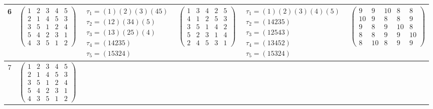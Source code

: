 \begin{longtable}{|c|p{2.7cm}|p{2.7cm}|p{2.7cm}|p{2.7cm}|p{3.3cm}|}
    \hline
    6                                                                                                                                           &
    $\begin{pmatrix}1&2&3&4&5\\2&1&4&5&3\\3&5&1&2&4\\5&4&2&3&1\\4&3&5&1&2\end{pmatrix}$                                                         &
    $\begin{array}{l}\tau_{1}=(1)(2)(3)(45)\\ \tau_{2}=(12)(34)(5)\\ \tau_{3}=(13)(25)(4)\\ \tau_{4}=(14235)\\ \tau_{5}=(15324)\end{array}$     &
    $\begin{pmatrix}1&3&4&2&5\\4&1&2&5&3\\3&5&1&4&2\\5&2&3&1&4\\2&4&5&3&1\end{pmatrix}$                                                         &
    $\begin{array}{l}\tau_{1}=(1)(2)(3)(4)(5)\\ \tau_{2}=(14235)\\ \tau_{3}=(12543)\\ \tau_{4}=(13452)\\ \tau_{5}=(15324)\end{array}$           &
    $\begin{pmatrix}9&9&10&8&8\\10&9&8&8&9\\9&8&9&10&8\\8&8&9&9&10\\8&10&8&9&9\end{pmatrix}$                                                                                                                                \\
    \hline
    7                                                                                                                                           &
    $\begin{pmatrix}1&2&3&4&5\\2&1&4&5&3\\3&5&1&2&4\\5&4&2&3&1\\4&3&5&1&2\end{pmatrix}$                                                         &

\end{longtable}
